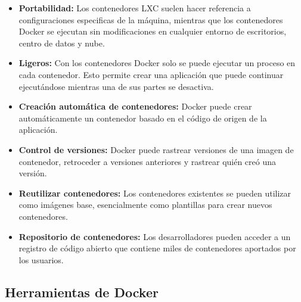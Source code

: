 			\begin{itemize}
					
				\item \textbf{Portabilidad:} Los contenedores LXC suelen hacer referencia a 		configuraciones especificas de la máquina, mientras que los contenedores Docker se ejecutan sin modificaciones en cualquier entorno de escritorios, centro de datos y nube.
				
				\item \textbf{Ligeros:} Con los contenedores Docker solo se puede ejecutar un proceso en cada contenedor. Esto permite crear una aplicación que puede continuar ejecutándose mientras una de sus partes se desactiva.
									
				\item \textbf{Creación automática de contenedores:} Docker puede crear automáticamente un contenedor basado en el código de origen de la aplicación.
				
				\item \textbf{Control de versiones:} Docker puede rastrear versiones de una imagen de contenedor, retroceder a versiones anteriores y rastrear quién creó una versión. 
			
				\item \textbf{Reutilizar contenedores:} Los contenedores existentes se pueden utilizar como imágenes base, esencialmente como plantillas para crear nuevos contenedores.
				
				\item \textbf{Repositorio de contenedores:} Los desarrolladores pueden acceder a un registro de código abierto que contiene miles de contenedores aportados por los usuarios.
			
			\end{itemize}
			
		\subsection{Herramientas de Docker}
			
			\vspace{0.3cm}
			
